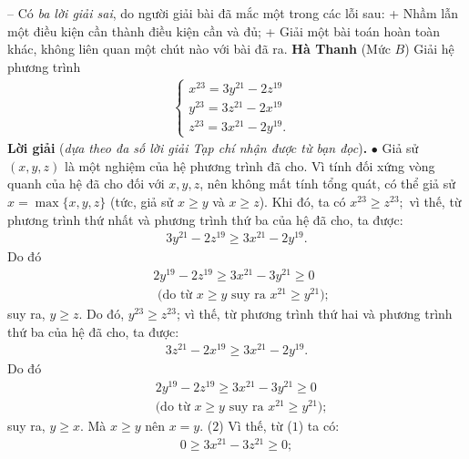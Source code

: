 \begin{multicols}{2}
	\vskip 0.05cm
	-- Có \textit{ba lời giải sai}, do người giải bài đã mắc một trong các lỗi sau:
	\vskip 0.05cm
	+ Nhầm lẫn một điều kiện cần thành điều kiện cần và đủ;
	\vskip 0.05cm
	+ Giải một bài toán hoàn toàn khác, không liên quan một chút nào với bài đã ra.
	\vskip 0.05cm
	\hfill	\textbf{\color{thachthuctoanhoc}Hà Thanh}
	\vskip 0.05cm
	{}
	(Mức $B$) Giải hệ phương trình
	\begin{align*}
		\begin{cases}
			x^{23}=3y^{21}-2z^{19}&\\[-0.5ex]
			y^{23}=3z^{21}-2x^{19}&\\[-0.5ex]
			z^{23}=3x^{21}-2y^{19}.
		\end{cases}
	\end{align*}
	\textbf{\color{thachthuctoanhoc}Lời giải} (\textit{dựa theo đa số lời giải Tạp chí nhận được từ bạn đọc})\textbf{\color{thachthuctoanhoc}.}
	\vskip 0.05cm
	$\bullet$ Giả sử $(x, y, z)$ là một nghiệm của hệ phương trình đã cho.
	\vskip 0.05cm
	Vì tính đối xứng vòng quanh của hệ đã cho đối với $x, y, z$, nên không mất tính tổng quát, có thể giả sử $x = \max\{x, y, z\}$ (tức, giả sử $x \ge y$ và $x \ge z$).
	\vskip 0.05cm
	Khi đó, ta có ${x^{23}} \ge {z^{23}};$ vì thế, từ phương trình thứ nhất và phương trình thứ ba của hệ đã cho, ta được:
	\begin{align*}
		3{y^{21}} - 2{z^{19}} \ge 3{x^{21}} - 2{y^{19}}.
	\end{align*}
	Do đó 
	\begin{align*}
		&2{y^{19}} - 2{z^{19}} \ge 3{x^{21}} - 3{y^{21}} \ge 0 \\[-0.5ex]
		&\text{ (do từ } x \ge y \text{ suy ra } x^{21} \ge y^{21});
	\end{align*}
	suy ra, $y \ge z$. Do đó,  $y^{23} \ge z^{23}$; vì thế, từ phương trình thứ hai và phương trình thứ ba của hệ đã cho, ta được:
	\begin{align*}
		3{z^{21}} - 2{x^{19}} \ge 3{x^{21}} - 2{y^{19}}.
	\end{align*}
	Do đó
	\begin{align*}
		&2{y^{19}} - 2{z^{19}} \ge 3{x^{21}} - 3{y^{21}} \ge 0 \\[-0.5ex]
		&\text{(do từ } x \ge y \text{ suy ra } x^{21} \ge y^{21}); \tag{$1$}
	\end{align*}
	suy ra, $y \ge x$. Mà $x \ge y$ nên $x = y$.  \hfill ($2$)
	\vskip 0.05cm
	Vì thế, từ ($1$) ta có:
	\begin{align*}
		0 \ge 3{x^{21}} - 3{z^{21}} \ge 0;

\end{align*}
\end{multicols}
